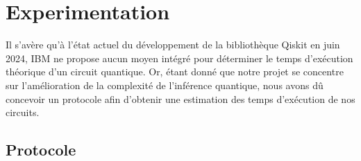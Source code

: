\section{Experimentation}

Il s'avère qu'à l'état actuel du développement de la bibliothèque Qiskit en juin 2024, IBM ne propose aucun moyen intégré pour déterminer le temps d'exécution théorique d'un circuit quantique. Or, étant donné que notre projet se concentre sur l'amélioration de la complexité de l'inférence quantique, nous avons dû concevoir un protocole afin d'obtenir une estimation des temps d'exécution de nos circuits.

\subsection{Protocole}

